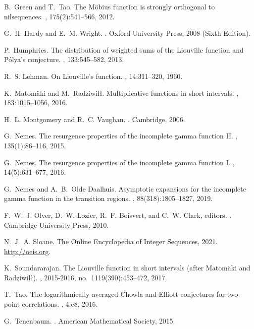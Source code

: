 \documentclass[11pt,reqno,a4letter]{article}
\numberwithin{equation}{section}
\numberwithin{figure}{section}
\numberwithin{table}{section}
\theoremstyle{plain}
\numberwithin{theorem}{section}
\theoremstyle{definition}
\theoremstyle{remark}
\begin{document}
\begin{thebibliography}{10}
B.~Green and T.~Tao.
\newblock The {M}\"{o}bius function is strongly orthogonal to nilsequences.
, 175(2):541--566, 2012.

G.~H. Hardy and E.~M. Wright.
.
\newblock Oxford University Press, 2008 (Sixth Edition).

P.~Humphries.
\newblock The distribution of weighted sums of the {L}iouville function and
  {P}\'{o}lya's conjecture.
, 133:545--582, 2013.

R.~S. Lehman.
\newblock On {L}iouville's function.
, 14:311--320, 1960.

K.~Matom{\"{a}}ki and M.~Radziwi{\l\l}.
\newblock Multiplicative functions in short intervals.
, 183:1015--1056, 2016.

H.~L. Montgomery and R.~C. Vaughan.
.
\newblock Cambridge, 2006.

G.~Nemes.
\newblock The resurgence properties of the incomplete gamma function {II}.
, 135(1):86--116, 2015.

G.~Nemes.
\newblock The resurgence properties of the incomplete gamma function {I}.
, 14(5):631--677, 2016.

G.~Nemes and A.~B.~Olde Daalhuis.
\newblock Asymptotic expansions for the incomplete gamma function in the
  transition regions.
, 88(318):1805--1827, 2019.

F.~W.~J. Olver, D.~W. Lozier, R.~F. Boisvert, and C.~W. Clark, editors.
.
\newblock Cambridge University Press, 2010.

N.~J.~A. Sloane.
\newblock The {O}nline {E}ncyclopedia of {I}nteger {S}equences, 2021.
\newblock \url{http://oeis.org}.

K.~Soundararajan.
\newblock The {L}iouville function in short intervals (after {M}atom{\"{a}}ki
  and {R}adziwi{\l}{\l}).
, 2015-2016, no.~1119(390):453--472, 2017.

T.~Tao.
\newblock The logarithmically averaged {C}howla and {E}lliott conjectures for
  two-point correlations.
, 4:e8, 2016.

G.~Tenenbaum.
.
\newblock American Mathematical Society, 2015.

\end{thebibliography}
\end{document}
